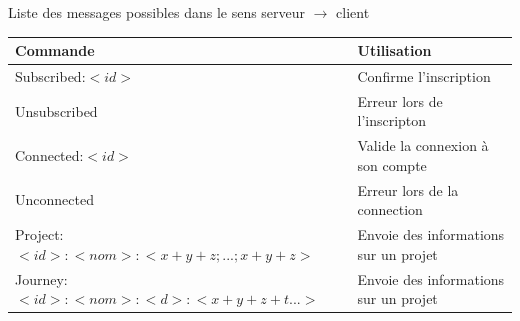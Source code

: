     \begin{center}
        Liste des messages possibles dans le sens serveur $\rightarrow$ client
        \par
        \begin{tabular}{|l|l|}
            \hline
            Commande & Utilisation\\
            \hline
            Subscribed:$<id>$ & Confirme l'inscription \\
            \hline
            Unsubscribed & Erreur lors de l'inscripton \\
            \hline
            Connected:$<id>$ & Valide la connexion à son compte\\
            \hline
            Unconnected & Erreur lors de la connection \\
            \hline
            \hline
            Project:$<id>:<nom>:<x+y+z;...;x+y+z>$ & Envoie des informations sur un projet\\
            \hline
            Journey:$<id>:<nom>:<d>:<x+y+z+t...>$ & Envoie des informations sur un projet\\
            \hline
        \end{tabular}
    \end{center}

